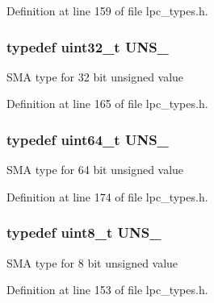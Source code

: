 Definition at line 159 of file lpc\+\_\+types.\+h.

\subsubsection[{\texorpdfstring{U\+N\+S\+\_\+32}{UNS_32}}]{\setlength{\rightskip}{0pt plus 5cm}typedef {\bf uint32\+\_\+t} {\bf U\+N\+S\+\_}}\hypertarget{group___l_p_c___types___public___types_ga28adf5c6b1811ca447826319598d8aba}{}\label{group___l_p_c___types___public___types_ga28adf5c6b1811ca447826319598d8aba}
S\+MA type for 32 bit unsigned value 

Definition at line 165 of file lpc\+\_\+types.\+h.

\subsubsection[{\texorpdfstring{U\+N\+S\+\_\+64}{UNS_64}}]{\setlength{\rightskip}{0pt plus 5cm}typedef uint64\+\_\+t {\bf U\+N\+S\+\_}}\hypertarget{group___l_p_c___types___public___types_ga2299199b92f0535ad8c2e2d8c7c7f09b}{}\label{group___l_p_c___types___public___types_ga2299199b92f0535ad8c2e2d8c7c7f09b}
S\+MA type for 64 bit unsigned value 

Definition at line 174 of file lpc\+\_\+types.\+h.

\subsubsection[{\texorpdfstring{U\+N\+S\+\_\+8}{UNS_8}}]{\setlength{\rightskip}{0pt plus 5cm}typedef {\bf uint8\+\_\+t} {\bf U\+N\+S\+\_}}\hypertarget{group___l_p_c___types___public___types_ga7353117656180c64d2216c874998b98b}{}\label{group___l_p_c___types___public___types_ga7353117656180c64d2216c874998b98b}
S\+MA type for 8 bit unsigned value 

Definition at line 153 of file lpc\+\_\+types.\+h.



